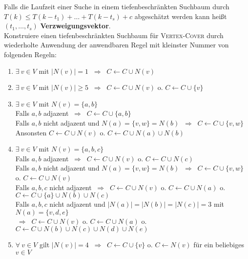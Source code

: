 \documentclass[a4paper,10pt]{scrartcl}
\newcommand{\tbf}{\textbf}
\newcommand{\tsc}{\textsc}
\newcommand{\Ra}{\Rightarrow}
\newcommand{\agn}{\leftarrow}
\begin{document}
Falls die Laufzeit einer Suche in einem tiefenbeschränkten Suchbaum durch $T(k) \leq T(k - t_1) + \ldots + T(k - t_s) + c$ abgeschätzt werden kann heißt $(t_1, \ldots, t_s)$ \tbf{Verzweigungsvektor}. \\

Konstruiere einen tiefenbeschränkten Suchbaum für \tsc{Vertex-Cover} durch wiederholte Anwendung der anwendbaren Regel mit kleinster Nummer von folgenden Regeln:
\begin{enumerate}
 \item $\exists \ v \in V$ mit $|N(v)| = 1$ $\ \Ra \ $ $C \agn C \cup N(v)$ 
 \item $\exists \ v \in V$ mit $|N(v)| \geq 5$ $\ \Ra \ $ $C \agn C \cup N(v)$ o. $C \agn C \cup \{v\}$
 \item $\exists \ v \in V$ mit $N(v) = \{a,b\}$\\
Falls $a,b$ adjazent $\ \Ra \ $ $C \agn C \cup \{a,b\}$ \\
Falls $a,b$ nicht adjazent und $N(a) = \{v,w\} = N(b)$ $\ \Ra \ $ $C \agn C \cup \{v,w\}$ \\
Ansonsten $C \agn C \cup N(v)$ o. $C \agn C \cup N(a) \cup N(b)$
 \item $\exists \ v \in V$ mit $N(v) = \{a,b,c\}$\\
Falls $a,b$ adjazent $\ \Ra \ $ $C \agn C \cup N(v)$ o. $C \agn C \cup N(c)$ \\
Falls $a,b$ nicht adjazent und $N(a) = \{v,w\} = N(b)$ $\ \Ra \ $ $C \agn C \cup \{v,w\}$ o. $C \agn C \cup N(v)$ \\
Falls $a,b,c$ nicht adjazent $\ \Ra \ $ $C \agn C \cup N(v)$ o. $C \agn C \cup N(a)$ o. $C \agn C \cup \{a\} \cup N(b) \cup N(c)$ \\
Falls $a,b,c$ nicht adjazent und $|N(a)|=|N(b)|=|N(c)|=3$ mit $N(a) = \{v,d,e\}$ \\ 
$\ \Ra \ $ $C \agn C \cup N(v)$ o. $C \agn C \cup N(a)$ o. $C \agn C \cup N(b) \cup N(c) \cup N(d) \cup N(e)$
 \item $\forall \ v \in V$ gilt $|N(v)| = 4$ $\ \Ra \ $ $C \agn C \cup \{v\}$ o. $C \agn N(v)$ für ein beliebiges $v \in V$
\end{enumerate}
\end{document}
